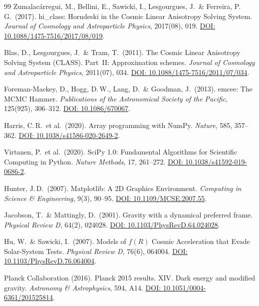\documentclass[aps,prd,twocolumn,superscriptaddress,nofootinbib]{revtex4-2}
\begin{document}
\begin{thebibliography}{99}
Zumalac\'arregui, M., Bellini, E., Sawicki, I., Lesgourgues, J.\ \& Ferreira, P.\,G.\ (2017).
hi\_class: Horndeski in the Cosmic Linear Anisotropy Solving System.
\textit{Journal of Cosmology and Astroparticle Physics}, 2017(08), 019.
\href{https://doi.org/10.1088/1475-7516/2017/08/019}{DOI: 10.1088/1475-7516/2017/08/019}.

Blas, D., Lesgourgues, J.\ \& Tram, T.\ (2011).
The Cosmic Linear Anisotropy Solving System (CLASS). Part~II: Approximation schemes.
\textit{Journal of Cosmology and Astroparticle Physics}, 2011(07), 034.
\href{https://doi.org/10.1088/1475-7516/2011/07/034}{DOI: 10.1088/1475-7516/2011/07/034}.

Foreman-Mackey, D., Hogg, D.\,W., Lang, D.\ \& Goodman, J.\ (2013).
emcee: The MCMC Hammer.
\textit{Publications of the Astronomical Society of the Pacific}, 125(925), 306--312.
\href{https://doi.org/10.1086/670067}{DOI: 10.1086/670067}.

Harris, C.\,R.\ et al.\ (2020).
Array programming with NumPy.
\textit{Nature}, 585, 357--362.
\href{https://doi.org/10.1038/s41586-020-2649-2}{DOI: 10.1038/s41586-020-2649-2}.

Virtanen, P.\ et al.\ (2020).
SciPy 1.0: Fundamental Algorithms for Scientific Computing in Python.
\textit{Nature Methods}, 17, 261--272.
\href{https://doi.org/10.1038/s41592-019-0686-2}{DOI: 10.1038/s41592-019-0686-2}.

Hunter, J.\,D.\ (2007).
Matplotlib: A 2D Graphics Environment.
\textit{Computing in Science \& Engineering}, 9(3), 90--95.
\href{https://doi.org/10.1109/MCSE.2007.55}{DOI: 10.1109/MCSE.2007.55}.

Jacobson, T.\ \& Mattingly, D.\ (2001).
Gravity with a dynamical preferred frame.
\textit{Physical Review D}, 64(2), 024028.
\href{https://doi.org/10.1103/PhysRevD.64.024028}{DOI: 10.1103/PhysRevD.64.024028}.

Hu, W.\ \& Sawicki, I.\ (2007).
Models of $f(R)$ Cosmic Acceleration that Evade Solar-System Tests.
\textit{Physical Review D}, 76(6), 064004.
\href{https://doi.org/10.1103/PhysRevD.76.064004}{DOI: 10.1103/PhysRevD.76.064004}.

Planck Collaboration (2016).
Planck 2015 results. XIV. Dark energy and modified gravity.
\textit{Astronomy \& Astrophysics}, 594, A14.
\href{https://doi.org/10.1051/0004-6361/201525814}{DOI: 10.1051/0004-6361/201525814}.


\end{thebibliography}
\end{document}
